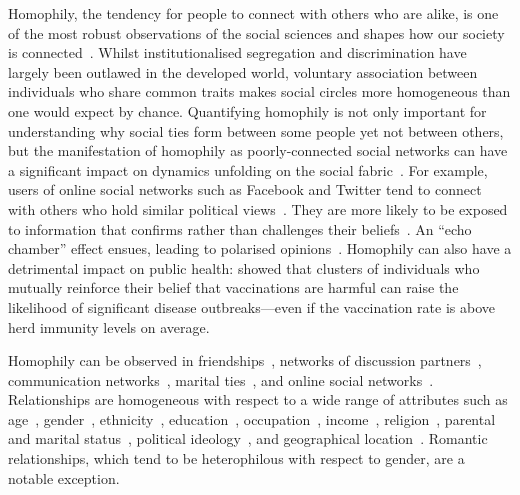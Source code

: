 \documentclass{scrartcl}
\begin{document}
Homophily, the tendency for people to connect with others who are alike, is one of the most robust observations of the social sciences and shapes how our society is connected~\cite{McPherson2001}. Whilst institutionalised segregation and discrimination have largely been outlawed in the developed world, voluntary association between individuals who share common traits makes social circles more homogeneous than one would expect by chance. Quantifying homophily is not only important for understanding why social ties form between some people yet not between others, but the manifestation of homophily as poorly-connected social networks can have a significant impact on dynamics unfolding on the social fabric~\cite{Golub2012}. For example, users of online social networks such as Facebook and Twitter tend to connect with others who hold similar political views~\cite{Boutyline2017}. They are more likely to be exposed to information that confirms rather than challenges their beliefs~\cite{Bakshy2015}. An ``echo chamber'' effect ensues, leading to polarised opinions~\cite{DeMarzo2003}. Homophily can also have a detrimental impact on public health: \textcite{Salathe2008} showed that clusters of individuals who mutually reinforce their belief that vaccinations are harmful can raise the likelihood of significant disease outbreaks---even if the vaccination rate is above herd immunity levels on average.

Homophily can be observed in friendships~\cite{Currarini2009, Hipp2009}, networks of discussion partners~\cite{McPherson2006}, communication networks~\cite{Wang2013, Leo2016}, marital ties~\cite{Blau1984}, and online social networks~\cite{Chang2010}. Relationships are homogeneous with respect to a wide range of attributes such as age~\cite{Marsden1988,Smith2014}, gender~\cite{Stehle2011,Smith2014}, ethnicity~\cite{Chang2010, Blumenstock2013, Currarini2009}, education~\cite{McPherson2006, Smith2014,Johnson1989}, occupation~\cite{Chan2004}, income~\cite{Leo2016, Wang2013, Johnson1989}, religion~\cite{Platt2012}, parental~\cite{Johnson1989} and marital status~\cite{Kalmijn2007}, political ideology~\cite{Bakshy2015, Boutyline2017}, and geographical location~\cite{Lambiotte2008, Expert2011, Backstrom2010, Scellato2011, Illenberger2013}. Romantic relationships, which tend to be heterophilous with respect to gender, are a notable exception.
\end{document}
